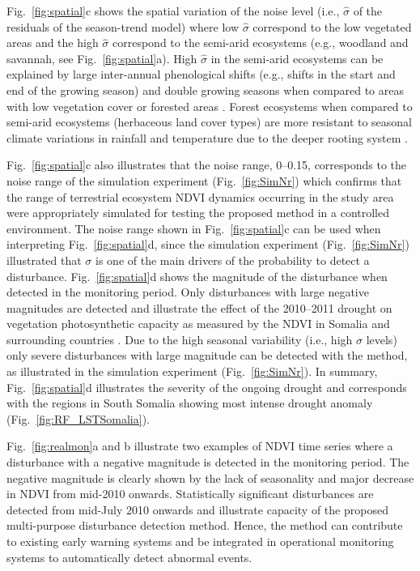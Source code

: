 \documentclass[authoryear,preprint,review,10pt]{elsarticle}
\begin{document}
Fig.~\ref{fig:spatial}c shows the spatial variation of the noise level (i.e., $\hat \sigma$ of the residuals of the season-trend model) where low $\hat \sigma$ correspond to the low vegetated areas and the high $\hat \sigma$ correspond to the semi-arid ecosystems (e.g., woodland and savannah, see Fig.~\ref{fig:spatial}a). High $\hat \sigma$  in the semi-arid ecosystems can be explained by large inter-annual phenological shifts (e.g., shifts in the start and end of the growing season) and double growing seasons when compared to areas with low vegetation cover or forested areas \citep{Verbesselt:2010wo, Brown:2010fq}. Forest ecosystems when compared to semi-arid ecosystems (herbaceous land cover types) are more resistant to seasonal climate variations in rainfall and temperature due to the deeper rooting system \citep{Verbesselt2006}. 

Fig.~\ref{fig:spatial}c also illustrates that the noise range, 0--0.15, corresponds to the noise range of the simulation experiment (Fig.~\ref{fig:SimNr}) which confirms that the range of terrestrial ecosystem NDVI dynamics occurring in the study area were appropriately simulated for testing the proposed method in a controlled environment. 
The noise range shown in Fig.~\ref{fig:spatial}c can be used when interpreting Fig.~\ref{fig:spatial}d, since the simulation experiment (Fig.~\ref{fig:SimNr}) illustrated that $\sigma$ is one of the main drivers of the probability to detect a disturbance. Fig.~\ref{fig:spatial}d shows the magnitude of the disturbance when detected in the monitoring period. Only disturbances with large negative magnitudes are detected and illustrate the effect of the 2010--2011 drought on vegetation photosynthetic capacity as measured by the NDVI in Somalia and surrounding countries \citep{Funk:2011fg}. Due to the high seasonal variability (i.e., high $\sigma$ levels) only severe disturbances with large magnitude can be detected with the method, as illustrated in the simulation experiment (Fig.~\ref{fig:SimNr}). In summary, Fig.~\ref{fig:spatial}d illustrates the severity of the ongoing drought and corresponds with the regions in South Somalia showing most intense drought anomaly (Fig.~\ref{fig:RF_LSTSomalia}).

Fig.~\ref{fig:realmon}a and b illustrate two examples of NDVI time series where a disturbance with a negative magnitude is detected in the monitoring period. The negative magnitude is clearly shown by the lack of seasonality and major decrease in NDVI from mid-2010 onwards. Statistically significant disturbances are detected from mid-July 2010 onwards and illustrate capacity of the proposed multi-purpose disturbance detection method. Hence, the method can contribute to existing early warning systems and be integrated in operational monitoring systems to automatically detect abnormal events. 
\end{document}
